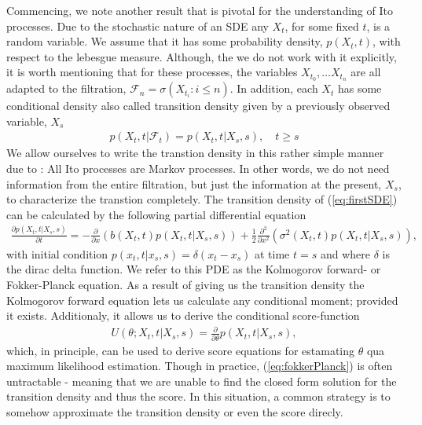 Commencing, we note another result that is pivotal for the understanding of Ito processes. Due to the stochastic nature of an SDE any $X_t$, for some fixed $t$, is a random variable. We assume that it has some probability density, $p(X_t, t)$, with respect to the lebesgue measure. Although, the we do not work with it explicitly, it is worth mentioning that for these processes, the variables $X_{t_0}, \dots X_{t_n}$ are all adapted to the filtration, $\mathcal{F}_n = \sigma\left(X_{t_i}: i \leq n\right)$. In addition, each $X_t$ has some conditional density also called transition density given by a previously observed variable, $X_s$ 
\begin{align}
    p(X_t, t| \mathcal{F}_t) = p(X_t, t | X_s, s), \quad t\geq s
\end{align}
We allow ourselves to write the transtion density in this rather simple manner due to \cite[theorem 7.1.2]{Oksendal2003_yu}: All Ito processes are Markov processes. In other words, we do not need information from the entire filtration, but just the information at the present, $X_s$, to characterize the transtion completely. The transition density of (\ref{eq:firstSDE}) can be calculated by the following partial differential equation
\begin{align}
    \frac{\partial p(X_t, t | X_s, s)}{\partial t} = -\frac{\partial}{\partial x}\left(b(X_t, t)p(X_t, t | X_s, s)\right) + \frac{1}{2}\frac{\partial^2}{\partial x^2}\left(\sigma^2(X_t, t)p(X_t, t | X_s, s)\right),\label{eq:fokkerPlanck} 
\end{align}
with initial condition $p(x_t, t|x_s, s) = \delta(x_t - x_s)$ at time $t = s$ and where $\delta$ is the dirac delta function. We refer to this PDE as the Kolmogorov forward- or Fokker-Planck equation. As a result of giving us the transition density the Kolmogorov forward equation lets us calculate any conditional moment; provided it exists. Additionaly, it allows us to derive the conditional score-function
\begin{align}
    U(\theta; X_t, t | X_s, s) = \frac{\partial}{\partial\theta}p(X_t, t | X_s, s), \label{eq:transitionScore}
\end{align}
which, in principle, can be used to derive score equations for estamating $\theta$ qua maximum likelihood estimation. Though in practice, (\ref{eq:fokkerPlanck}) is often untractable - meaning that we are unable to find the closed form solution for the transition density and thus the score. In this situation, a common strategy is to somehow approximate the transition density or even the score direcly. 

